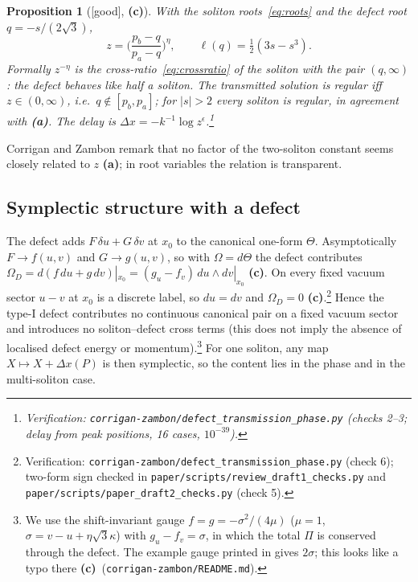 \documentclass[11pt,a4paper]{article}
\newcommand{\lab}[1]{{\normalfont\sffamily\footnotesize\bfseries(#1)}}
\newcommand{\La}{\lab{a}}
\newcommand{\Lc}{\lab{c}}
\newcommand{\eqtag}[2]{{\normalfont\sffamily\footnotesize\textcolor{#1}{[#2]}}}
\newcommand{\Good}{\eqtag{teal!70!black}{good}}
\newcommand{\scr}[1]{\nolinkurl{#1}}
\newcommand{\chk}[1]{\footnote{\raggedright Verification: #1.}}
\newtheorem{proposition}{Proposition}[section]
\theoremstyle{remark}
\begin{document}
\begin{proposition}[\Good, \Lc]\label{prop:z}
With the soliton roots~\eqref{eq:roots} and the \emph{defect root} $q=-s/(2\sqrt3)$,
\begin{equation}\label{eq:zroot}
z=\Big(\frac{p_b-q}{p_a-q}\Big)^{\eta},\qquad \ell(q)=\tfrac12(3s-s^3).
\end{equation}
Formally $z^{-\eta}$ is the cross-ratio~\eqref{eq:crossratio} of the soliton with the pair $(q,\infty)$: the defect behaves like half a soliton. The transmitted solution is regular iff $z\in(0,\infty)$, i.e.\ $q\notin[p_b,p_a]$; for $|s|>2$ every soliton is regular, in agreement with \cite{CZ} \La. The delay is $\Delta x=-k^{-1}\log z^\epsilon$.\chk{\scr{corrigan-zambon/defect_transmission_phase.py} (checks 2--3; delay from peak positions, 16 cases, $10^{-39}$)}
\end{proposition}

Corrigan and Zambon remark that no factor of the two-soliton constant seems closely related to $z$ \La; in root variables the relation is transparent.

\subsection{Symplectic structure with a defect}

The defect adds $F\,\delta u+G\,\delta v$ at $x_0$ to the canonical one-form $\Theta$. Asymptotically $F\to f(u,v)$ and $G\to g(u,v)$, so with $\Omega=d\Theta$ the defect contributes $\Omega_D=d(f\,du+g\,dv)|_{x_0}=(g_u-f_v)\,du\wedge dv|_{x_0}$ \Lc. On every fixed vacuum sector $u-v$ at $x_0$ is a discrete label, so $du=dv$ and $\Omega_D=0$ \Lc.\chk{\scr{corrigan-zambon/defect_transmission_phase.py} (check 6); two-form sign checked in \scr{paper/scripts/review_draft1_checks.py} and \scr{paper/scripts/paper_draft2_checks.py} (check 5)} Hence the type-I defect contributes no continuous canonical pair on a fixed vacuum sector and introduces no soliton--defect cross terms (this does not imply the absence of localised defect energy or momentum).\footnote{We use the shift-invariant gauge $f=g=-\sigma^2/(4\mu)$ ($\mu=1$, $\sigma=v-u+\eta\sqrt3\kappa$) with $g_u-f_v=\sigma$, in which the total $\Pi$ is conserved through the defect. The example gauge printed in \cite[(3.43),(3.47)]{CZ} gives $2\sigma$; this looks like a typo there \Lc\ (\scr{corrigan-zambon/README.md}).} For one soliton, any map $X\mapsto X+\Delta x(P)$ is then symplectic, so the content lies in the phase and in the multi-soliton case.
\end{document}
